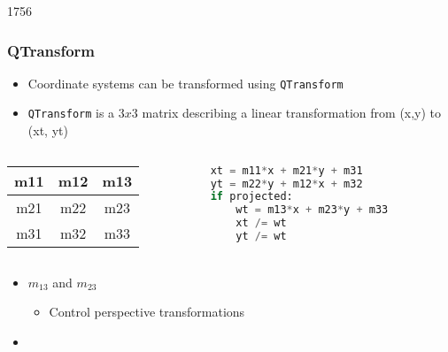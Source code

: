 
\begin{slide}[fragile]{1756}


\frametitle{QTransform}
\begin{itemize}
\item Coordinate systems can be transformed using \texttt{QTransform}
\item \texttt{QTransform} is a $3x3$ matrix describing a linear transformation from (x,y) to (xt, yt)
\end{itemize}
\begin{columns}[t]
\begin{column}{50mm}

\begin{tabular}{c|c|c}
m11 & m12 & m13 \\ \hline
m21 & m22 & m23 \\ \hline
m31 & m32 & m33 \\
\end{tabular}

\end{column}
\begin{column}{50mm}

\begin{lstlisting}[language=Python]
xt = m11*x + m21*y + m31 
yt = m22*y + m12*x + m32 
if projected: 
    wt = m13*x + m23*y + m33  
    xt /= wt 
    yt /= wt 
\end{lstlisting}
\end{column}
\end{columns}
\begin{itemize}
\item $m_{13}$ and $m_{23}$
    \begin{itemize}
    \item Control perspective transformations
    \end{itemize}
\item {}
\end{itemize}

\end{slide}


